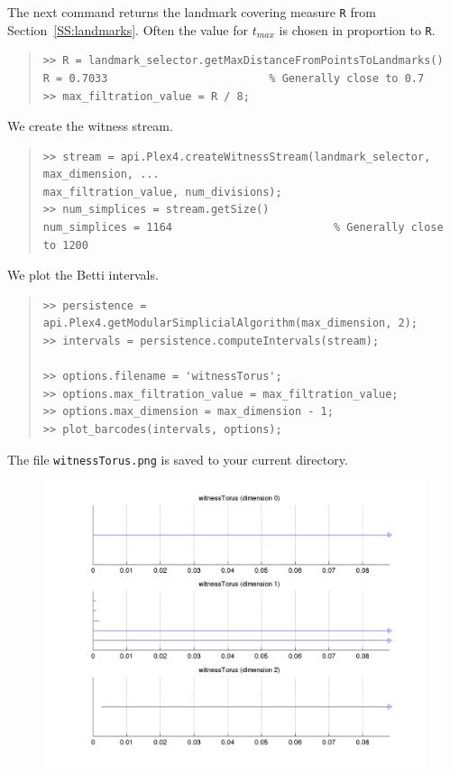 \documentclass[amscd, amssymb, verbatim]{amsart}[12pt]
\theoremstyle{remark}
\theoremstyle{remark}
\theoremstyle{remark}
\begin{document}
The next command returns the landmark covering measure \texttt{R} from Section~\ref{SS:landmarks}.  Often the value for $t_{max}$ is chosen in proportion to \texttt{R}.

\begin{quote} \begin{verbatim}
>> R = landmark_selector.getMaxDistanceFromPointsToLandmarks()
R = 0.7033                         % Generally close to 0.7
>> max_filtration_value = R / 8; 
\end{verbatim} \end{quote}

We create the witness stream.

\begin{quote} \begin{verbatim}
>> stream = api.Plex4.createWitnessStream(landmark_selector, max_dimension, ...
max_filtration_value, num_divisions); 
>> num_simplices = stream.getSize()
num_simplices = 1164                         % Generally close to 1200
\end{verbatim} \end{quote}

We plot the Betti intervals.

\begin{quote} \begin{verbatim}
>> persistence = api.Plex4.getModularSimplicialAlgorithm(max_dimension, 2);
>> intervals = persistence.computeIntervals(stream);

>> options.filename = 'witnessTorus';
>> options.max_filtration_value = max_filtration_value;
>> options.max_dimension = max_dimension - 1;
>> plot_barcodes(intervals, options);
\end{verbatim} \end{quote}

The file \texttt{witnessTorus.png} is saved to your current directory.

\begin{figure}[htp]
	\begin{center}
    	\includegraphics[width=6in]{witnessTorus.png}
   	\end{center}
\end{figure}
\FloatBarrier
\end{document}
